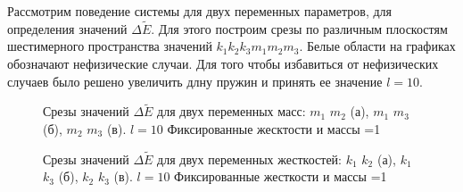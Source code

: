 Рассмотрим поведение системы для двух переменных параметров, для определения значений $\Delta \tilde{E}$.
Для этого построим срезы по различным плоскостям шестимерного пространства значений $k_1 k_2 k_3 m_1 m_2 m_3$. 
Белые области на графиках обозначают нефизические случаи. Для того чтобы избавиться от нефизических случаев было решено увеличить длну пружин и 
принять ее значение $l=10$.

\begin{figure}[b!]
    \begin{minipage}[h]{0.5\linewidth}
    \end{minipage}
    \hfill
    \begin{minipage}[h]{0.5\linewidth}
    \end{minipage}
    \begin{center}
        \begin{minipage}[h]{0.5\linewidth}
        \end{minipage}
    \end{center}
    \caption{Срезы значений $\Delta \tilde{E}$ для двух переменных масс: $m_1$ $m_2$ (а), $m_1$ $m_3$ (б), $m_2$ $m_3$ (в). $l =10$ Фиксированные жесктости и массы =1}
    \label{fig:var2mass}
\end{figure}

\begin{figure}[b!]
    \begin{minipage}[h]{0.5\linewidth}
    \end{minipage}
    \hfill
    \begin{minipage}[h]{0.5\linewidth}
    \end{minipage}
    \begin{center}
        \begin{minipage}[h]{0.5\linewidth}
        \end{minipage}
    \end{center}
    \caption{Срезы значений $\Delta \tilde{E}$ для двух переменных жесткостей: $k_1$ $k_2$ (а), $k_1$ $k_3$ (б), $k_2$ $k_3$ (в). $l =10$ Фиксированные жесткости и массы =1}
    \label{fig:var2stiff}
\end{figure}



